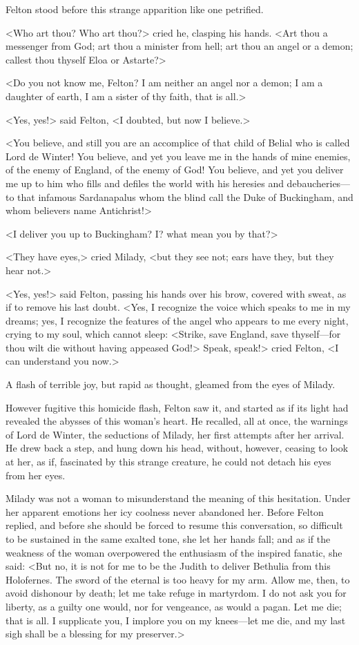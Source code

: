 Felton stood before this strange apparition like one petrified. 

<Who art thou? Who art thou?> cried he, clasping his hands. <Art thou a messenger from God; art thou a minister from hell; art thou an angel or a demon; callest thou thyself Eloa or Astarte?> 

<Do you not know me, Felton? I am neither an angel nor a demon; I am a daughter of earth, I am a sister of thy faith, that is all.> 

<Yes, yes!> said Felton, <I doubted, but now I believe.> 

<You believe, and still you are an accomplice of that child of Belial who is called Lord de Winter! You believe, and yet you leave me in the hands of mine enemies, of the enemy of England, of the enemy of God! You believe, and yet you deliver me up to him who fills and defiles the world with his heresies and debaucheries---to that infamous Sardanapalus whom the blind call the Duke of Buckingham, and whom believers name Antichrist!> 

<I deliver you up to Buckingham? I? what mean you by that?> 

<They have eyes,> cried Milady, <but they see not; ears have they, but they hear not.> 

<Yes, yes!> said Felton, passing his hands over his brow, covered with sweat, as if to remove his last doubt. <Yes, I recognize the voice which speaks to me in my dreams; yes, I recognize the features of the angel who appears to me every night, crying to my soul, which cannot sleep: <Strike, save England, save thyself---for thou wilt die without having appeased God!> Speak, speak!> cried Felton, <I can understand you now.> 

A flash of terrible joy, but rapid as thought, gleamed from the eyes of Milady. 

However fugitive this homicide flash, Felton saw it, and started as if its light had revealed the abysses of this woman's heart. He recalled, all at once, the warnings of Lord de Winter, the seductions of Milady, her first attempts after her arrival. He drew back a step, and hung down his head, without, however, ceasing to look at her, as if, fascinated by this strange creature, he could not detach his eyes from her eyes. 

Milady was not a woman to misunderstand the meaning of this hesitation. Under her apparent emotions her icy coolness never abandoned her. Before Felton replied, and before she should be forced to resume this conversation, so difficult to be sustained in the same exalted tone, she let her hands fall; and as if the weakness of the woman overpowered the enthusiasm of the inspired fanatic, she said: <But no, it is not for me to be the Judith to deliver Bethulia from this Holofernes. The sword of the eternal is too heavy for my arm. Allow me, then, to avoid dishonour by death; let me take refuge in martyrdom. I do not ask you for liberty, as a guilty one would, nor for vengeance, as would a pagan. Let me die; that is all. I supplicate you, I implore you on my knees---let me die, and my last sigh shall be a blessing for my preserver.> 

